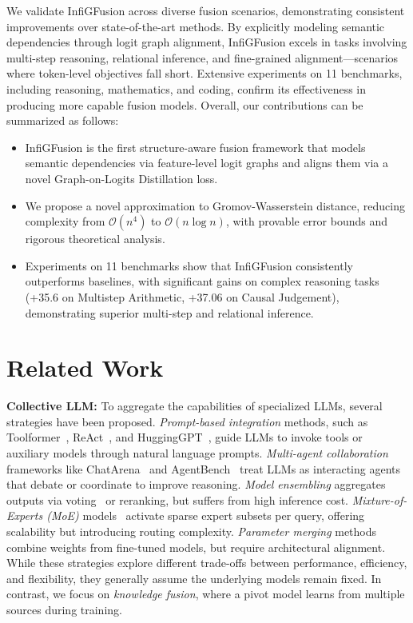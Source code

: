 \documentclass{article}
\begin{document}
We validate InfiGFusion across diverse fusion scenarios, demonstrating consistent improvements over state-of-the-art methods. By explicitly modeling semantic dependencies through logit graph alignment, InfiGFusion excels in tasks involving multi-step reasoning, relational inference, and fine-grained alignment—scenarios where token-level objectives fall short. Extensive experiments on 11 benchmarks, including reasoning, mathematics, and coding, confirm its effectiveness in producing more capable fusion models.
%
Overall, our contributions can be summarized as follows: 
\begin{itemize}
    \item InfiGFusion is the first structure-aware fusion framework that models semantic dependencies via feature-level logit graphs and aligns them via a novel Graph-on-Logits Distillation loss. 
    \item We propose a novel approximation to Gromov-Wasserstein distance, reducing complexity from $\mathcal{O}(n^4)$ to $\mathcal{O}(n \log n)$, with provable error bounds and rigorous theoretical analysis.
    \item Experiments on 11 benchmarks show that InfiGFusion consistently outperforms baselines, with significant gains on complex reasoning tasks (+35.6 on Multistep Arithmetic, +37.06 on Causal Judgement), demonstrating superior multi-step and relational inference.

\end{itemize}

\section{Related Work}

\textbf{Collective LLM:}
To aggregate the capabilities of specialized LLMs, several strategies have been proposed. \textit{Prompt-based integration} methods, such as Toolformer~\cite{schick2023toolformer}, ReAct~\cite{yao2023react}, and HuggingGPT~\cite{shen2023hugginggpt}, guide LLMs to invoke tools or auxiliary models through natural language prompts. \textit{Multi-agent collaboration} frameworks like ChatArena~\cite{zheng2023judging} and AgentBench~\cite{liu2024agentbench} treat LLMs as interacting agents that debate or coordinate to improve reasoning. \textit{Model ensembling} aggregates outputs via voting~\cite{wangself} or reranking, but suffers from high inference cost. \textit{Mixture-of-Experts (MoE)} models~\cite{komatsuzakisparse, du2022glam, chen2022towards} activate sparse expert subsets per query, offering scalability but introducing routing complexity. \textit{Parameter merging} methods~\cite{yadav2023ties, matena2022merging, wortsman2022model} combine weights from fine-tuned models, but require architectural alignment. While these strategies explore different trade-offs between performance, efficiency, and flexibility, they generally assume the underlying models remain fixed. In contrast, we focus on \textit{knowledge fusion}, where a pivot model learns from multiple sources during training.
\end{document}
